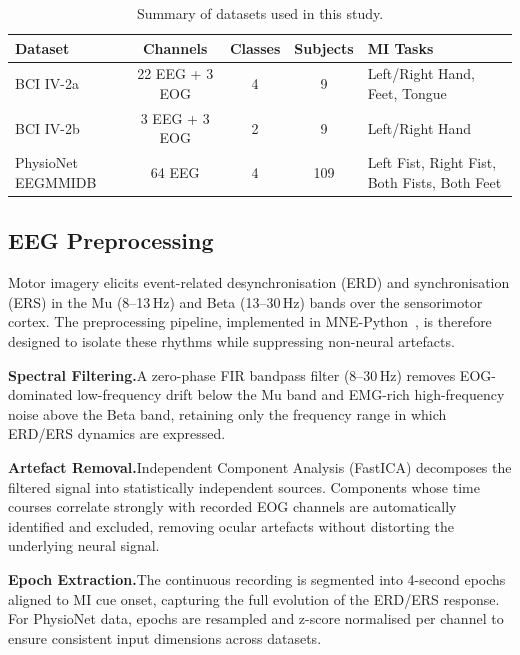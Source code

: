 \documentclass[12pt, a4paper]{article}
\begin{document}
\begin{table}[htbp]
\centering
\caption{Summary of datasets used in this study.}
\label{tab:datasets}
\begin{tabular}{lcccl}
\toprule
\textbf{Dataset} & \textbf{Channels} & \textbf{Classes} & \textbf{Subjects} & \textbf{MI Tasks} \\
\midrule
BCI IV-2a & 22 EEG + 3 EOG & 4 & 9 & Left/Right Hand, Feet, Tongue \\
BCI IV-2b & 3 EEG + 3 EOG & 2 & 9 & Left/Right Hand \\
PhysioNet EEGMMIDB & 64 EEG & 4 & 109 & Left Fist, Right Fist, Both Fists, Both Feet \\
\bottomrule
\end{tabular}
\end{table}

\subsection{EEG Preprocessing}

Motor imagery elicits event-related desynchronisation (ERD) and synchronisation (ERS) in the Mu (8--13\,Hz) and Beta (13--30\,Hz) bands over the sensorimotor cortex. The preprocessing pipeline, implemented in MNE-Python~\cite{gramfort2013mne}, is therefore designed to isolate these rhythms while suppressing non-neural artefacts.

\textbf{Spectral Filtering.}\quad A zero-phase FIR bandpass filter (8--30\,Hz) removes EOG-dominated low-frequency drift below the Mu band and EMG-rich high-frequency noise above the Beta band, retaining only the frequency range in which ERD/ERS dynamics are expressed.

\textbf{Artefact Removal.}\quad Independent Component Analysis (FastICA) decomposes the filtered signal into statistically independent sources. Components whose time courses correlate strongly with recorded EOG channels are automatically identified and excluded, removing ocular artefacts without distorting the underlying neural signal.

\textbf{Epoch Extraction.}\quad The continuous recording is segmented into 4-second epochs aligned to MI cue onset, capturing the full evolution of the ERD/ERS response. For PhysioNet data, epochs are resampled and z-score normalised per channel to ensure consistent input dimensions across datasets.
\end{document}

